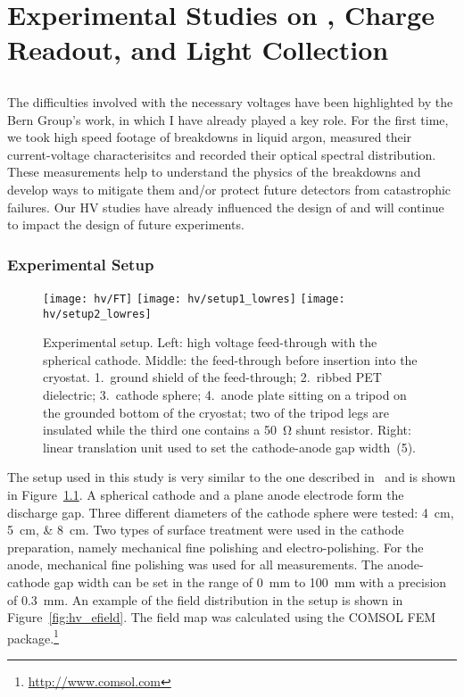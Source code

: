 \chapter{Experimental Studies on , Charge Readout, and Light Collection}
\label{chap:studies}


\section{}
\label{sec:studies_hv}

The difficulties involved with the necessary voltages have been highlighted by the Bern Group’s work, in which I have already played a key role\cite{breakdown_16}.
For the first time, we took high speed footage of breakdowns in liquid argon, measured their current-voltage characterisitcs and recorded their optical spectral distribution.
These measurements help to understand the physics of the breakdowns and develop ways to mitigate them and/or protect future detectors from catastrophic failures.
Our HV studies have already influenced the design of \uboone{} and will continue to impact the design of future experiments.


\subsection{Experimental Setup}
\label{sec:studies_hv_setup}

\begin{figure}[htb]
	\centering	
	\texttt{[image: hv/FT]}
	\texttt{[image: hv/setup1\_lowres]}
	\texttt{[image: hv/setup2\_lowres]}
	\caption{Experimental setup. Left: high voltage feed-through with the spherical cathode. Middle: the feed-through before insertion into the cryostat. 1.~ground shield of the feed-through; 2.~ribbed PET dielectric; 3.~cathode sphere; 4.~anode plate sitting on a tripod on the grounded bottom of the cryostat; two of the tripod legs are insulated while the third one contains a \SI{50}{\ohm} shunt resistor. Right: linear translation unit used to set the cathode-anode gap width~(5).}
	\label{fig:hv_setup1}
\end{figure}

The setup used in this study is very similar to the one described in~\cite{breakdown_14} and is shown in Figure~\ref{fig:hv_setup1}.
A spherical cathode and a plane anode electrode form the discharge gap.
Three different diameters of the cathode sphere were tested: \SIlist{4; 5; 8}{\centi\metre}.
Two types of surface treatment were used in the cathode preparation, namely mechanical fine polishing and electro-polishing.
For the anode, mechanical fine polishing was used for all measurements.
The anode-cathode gap width can be set in the range of \SI{0}{\milli\metre} to \SI{100}{\milli\metre} with a precision of \SI{0.3}{\milli\metre}.
An example of the field distribution in the setup is shown in Figure~\ref{fig:hv_efield}.
The field map was calculated using the COMSOL FEM package.\footnote{\url{http://www.comsol.com}}

